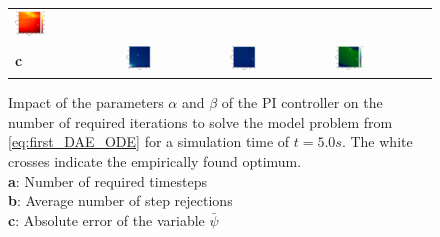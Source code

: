 \begin{figure}[H]
\begin{tabularx}{\textwidth}{m{} >{\centering\arraybackslash}m{} >{\centering\arraybackslash}m{} >{\centering\arraybackslash}m{}}
		\includegraphics[width=0.31\textwidth]{images/analysis_BDF23_NI.png} \\
		\textbf{c} &
    	\includegraphics[width=0.28\textwidth]{images/analysis_RKF45_psi.png} &
		\includegraphics[width=0.28\textwidth]{images/analysis_BDF12_psi.png} &
		\includegraphics[width=0.32\textwidth]{images/analysis_BDF23_psi.png} \\
	\end{tabularx}
    \caption{Impact of the parameters $\alpha$ and $\beta$ of the PI controller on the number of required iterations to solve the model problem from \autoref{eq:first_DAE_ODE} for a simulation time of $t=5.0s$. The white crosses indicate the empirically found optimum. \\ \textbf{a}: Number of required timesteps \\ \textbf{b}:  Average number of step rejections \\ \textbf{c}: Absolute error of the variable $\bar{\psi}$ }
    \label{fig:ParametersPIController}
\end{figure}
